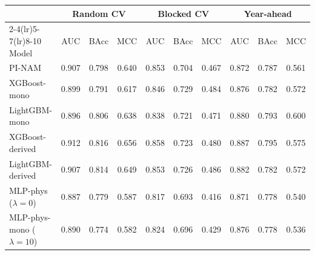 \begin{tabular}{lccccccccc}
\toprule
 & \multicolumn{3}{c}{Random CV} & \multicolumn{3}{c}{Blocked CV} & \multicolumn{3}{c}{Year-ahead} \\
\cmidrule(lr){2-4}\cmidrule(lr){5-7}\cmidrule(lr){8-10}
Model & AUC & BAcc & MCC & AUC & BAcc & MCC & AUC & BAcc & MCC \\
\midrule
PI-NAM & 0.907 & 0.798 & 0.640 & 0.853 & 0.704 & 0.467 & 0.872 & 0.787 & 0.561 \\
XGBoost-mono & 0.899 & 0.791 & 0.617 & 0.846 & 0.729 & 0.484 & 0.876 & 0.782 & 0.572 \\
LightGBM-mono & 0.896 & 0.806 & 0.638 & 0.838 & 0.721 & 0.471 & 0.880 & 0.793 & 0.600 \\
XGBoost-derived & 0.912 & 0.816 & 0.656 & 0.858 & 0.723 & 0.480 & 0.887 & 0.795 & 0.575 \\
LightGBM-derived & 0.907 & 0.814 & 0.649 & 0.853 & 0.726 & 0.486 & 0.882 & 0.782 & 0.572 \\
MLP-phys ($\lambda = 0$) & 0.887 & 0.779 & 0.587 & 0.817 & 0.693 & 0.416 & 0.871 & 0.778 & 0.540 \\
MLP-phys-mono ($\lambda = 10$) & 0.890 & 0.774 & 0.582 & 0.824 & 0.696 & 0.429 & 0.876 & 0.778 & 0.536 \\
\bottomrule
\end{tabular}
